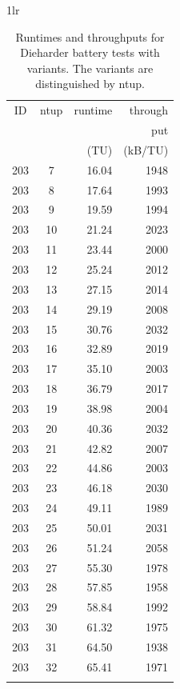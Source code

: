 \documentclass[
  digital,     %
  oneside,     %
  nosansbold,  %
  nocolorbold, %
  nolof,         %
  nolot,         %
]{fithesis4}
\begin{document}
\begin{table}[H]
\begin{tabularx}{1\textwidth}{lr}
    {\begin{tabularx}{0.5\textwidth}{c|c|r|r}
       ID & ntup & runtime & through\\
         & & & put \\
         & & (TU) & (kB/TU) \\
        \midrule 
        203 & 7 & 16.04 & 1948 \\
        203 & 8 & 17.64 & 1993 \\
        203 & 9 & 19.59 & 1994 \\
        203 & 10 & 21.24 & 2023 \\
        203 & 11 & 23.44 & 2000 \\
        203 & 12 & 25.24 & 2012 \\
        203 & 13 & 27.15 & 2014 \\
        203 & 14 & 29.19 & 2008 \\
        203 & 15 & 30.76 & 2032 \\
        203 & 16 & 32.89 & 2019 \\
        203 & 17 & 35.10 & 2003 \\
        203 & 18 & 36.79 & 2017 \\
        203 & 19 & 38.98 & 2004 \\
        203 & 20 & 40.36 & 2032 \\
        203 & 21 & 42.82 & 2007 \\
        203 & 22 & 44.86 & 2003 \\
        203 & 23 & 46.18 & 2030 \\
        203 & 24 & 49.11 & 1989 \\
        203 & 25 & 50.01 & 2031 \\
        203 & 26 & 51.24 & 2058 \\
        203 & 27 & 55.30 & 1978 \\
        203 & 28 & 57.85 & 1958 \\
        203 & 29 & 58.84 & 1992 \\
        203 & 30 & 61.32 & 1975 \\
        203 & 31 & 64.50 & 1938 \\
        203 & 32 & 65.41 & 1971 \\
         \\

    \end{tabularx}} 
  \end{tabularx}
  \caption{Runtimes and throughputs for Dieharder battery tests with variants. The variants are distinguished by ntup.}
  \label{tab:analysis_time_dieharder_variants}
\end{table}
\end{document}
